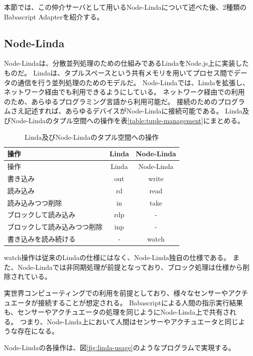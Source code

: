 本節では、この仲介サーバとして用いるNode-Lindaについて述べた後、2種類のBabascript
Adapterを紹介する。

\subsection{Node-Linda}\label{node-linda}

Node-Linda\cite{node-linda}は、分散並列処理のための仕組みであるLinda\cite{linda}をNode.js上に実装したものだ。
Lindaは、タプルスペースという共有メモリを用いてプロセス間でデータの通信を行う並列処理のためのモデルだ。
Node-Lindaでは、Lindaを拡張し、ネットワーク経由でも利用できるようにしている。
ネットワーク経由での利用のため、あらゆるプログラミング言語から利用可能だ。
接続のためのプログラムさえ記述すれば、あらゆるデバイスがNode-Lindaに接続可能である。
Linda及びNode-Lindaのタプル空間への操作を表\ref{table:tuple-management}にまとめる。

\begin{longtable}[c]{@{}lcc@{}}
\caption{Linda及びNode-Lindaのタプル空間への操作
\label{table:tuple-managemnet}}\tabularnewline
\toprule
操作 & Linda & Node-Linda\tabularnewline
\midrule
\endfirsthead
\toprule
操作 & Linda & Node-Linda\tabularnewline
\midrule
\endhead
書き込み & out & write\tabularnewline
読み込み & rd & read\tabularnewline
読み込みつつ削除 & in & take\tabularnewline
ブロックして読み込み & rdp & -\tabularnewline
ブロックして読み込みつつ削除 & inp & -\tabularnewline
書き込みを読み続ける & - & watch\tabularnewline
\bottomrule
\end{longtable}

watch操作は従来のLindaの仕様にはなく、Node-Linda独自の仕様である。
また、Node-Lindaでは非同期処理が前提となっており、ブロック処理は仕様から削除されている。

実世界コンピューティングでの利用を前提としており、様々なセンサーやアクチュエータが接続することが想定される。
Babascriptによる人間の指示実行結果も、センサーやアクチュエータの処理を同じようにNode-Linda上で共有される。
つまり、Node-Linda上において人間はセンサーやアクチュエータと同じような存在になる。

Node-Lindaの各操作は、図\ref{fig:linda-usage}のようなプログラムで実現する。

